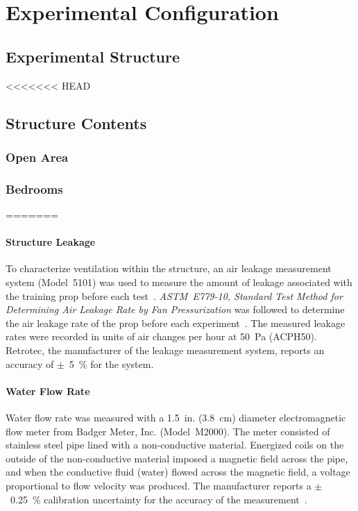 \documentclass[12pt,oneside]{book}
\begin{document}
\chapter{Experimental Configuration}
\label{chap:exp_config}

\section{Experimental Structure}





<<<<<<< HEAD
\section{Structure Contents}


\subsection{Open Area}



\subsection{Bedrooms}




=======
\subsubsection*{Structure Leakage} 
To characterize ventilation within the structure, an air leakage measurement system (Model~5101) was used to measure the amount of leakage associated with the training prop before each test~\cite{retrotec:leakage}. \textit{ASTM~E779-10, Standard Test Method for Determining Air Leakage Rate by Fan Pressurization} was followed to determine the air leakage rate of the prop before each experiment~\cite{astm_e779}. The measured leakage rates were recorded in units of air changes per hour at 50~Pa (ACPH50). Retrotec, the manufacturer of the leakage measurement system, reports an accuracy of $\pm$~5~\% for the system.

\subsubsection*{Water Flow Rate}
Water flow rate was measured with a 1.5~in. (3.8~cm) diameter electromagnetic flow meter from Badger Meter, Inc. (Model~M2000). The meter consisted of stainless steel pipe lined with a non-conductive material. Energized coils on the outside of the non-conductive material imposed a magnetic field across the pipe, and when the conductive fluid (water) flowed across the magnetic field, a voltage proportional to flow velocity was produced. The manufacturer reports a $\pm$~0.25~\% calibration uncertainty for the accuracy of the measurement~\cite{Badger:2015}.
\end{document}
